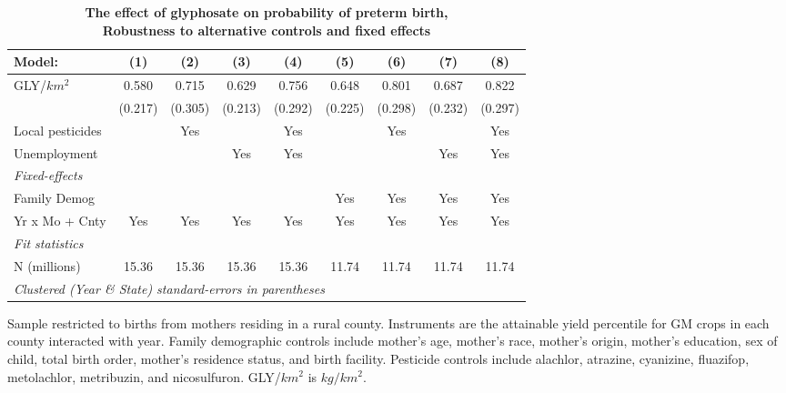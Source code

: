 \begin{table}[htbp]
   \centering
   \small
   \begin{threeparttable}[b]
      \caption{\label{tab:robust-cntrl-i_preterm-allyielddiffpercentilegmo} \textbf{The effect of glyphosate on probability of preterm birth, \\ Robustness to alternative controls and fixed effects}}
      \begin{tabular}{lcccccccc}
         \toprule
         Model:           & (1)     & (2)     & (3)     & (4)     & (5)     & (6)     & (7)     & (8)\\  
         \midrule 
         GLY/$km^2$       & 0.580   & 0.715   & 0.629   & 0.756   & 0.648   & 0.801   & 0.687   & 0.822\\   
                          & (0.217) & (0.305) & (0.213) & (0.292) & (0.225) & (0.298) & (0.232) & (0.297)\\   
         Local pesticides &         & Yes     &         & Yes     &         & Yes     &         & Yes\\  
         Unemployment     &         &         & Yes     & Yes     &         &         & Yes     & Yes\\  
         \midrule
         \emph{Fixed-effects}\\
         Family Demog     &         &         &         &         & Yes     & Yes     & Yes     & Yes\\  
         Yr x Mo + Cnty   & Yes     & Yes     & Yes     & Yes     & Yes     & Yes     & Yes     & Yes\\  
         \midrule
         \emph{Fit statistics}\\
         N (millions)     & 15.36   & 15.36   & 15.36   & 15.36   & 11.74   & 11.74   & 11.74   & 11.74\\  
         \midrule
         \multicolumn{9}{l}{\emph{Clustered (Year \& State) standard-errors in parentheses}}\\
      \end{tabular}
      
      \begin{tablenotes}\item Sample restricted to births from mothers residing in a rural county. Instruments are the attainable yield percentile for GM crops in each county interacted with year. Family demographic controls include mother's age, mother's race, mother's origin, mother's education, sex of child, total birth order, mother's residence status, and birth facility. Pesticide controls include alachlor, atrazine, cyanizine, fluazifop, metolachlor, metribuzin, and nicosulfuron. GLY/$km^2$ is $kg/km^2$.
      \end{tablenotes}
   \end{threeparttable}
\end{table}
